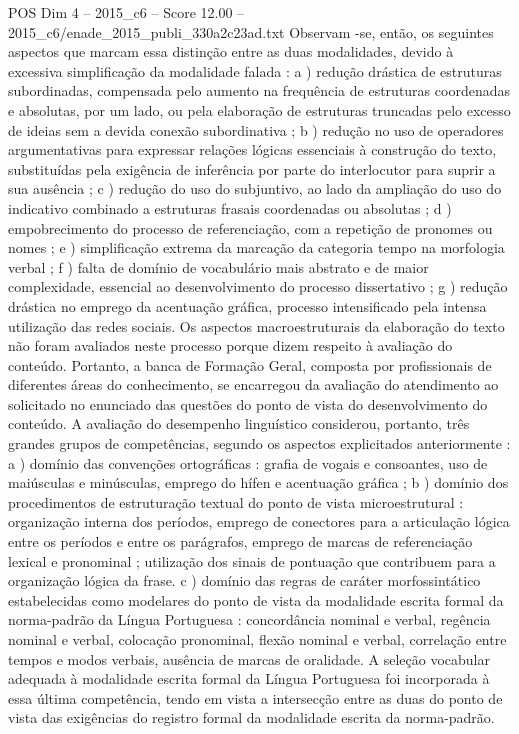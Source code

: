 \begin{textsample}{POS Dim 4 – 2015\_c6 – Score 12.00 – 2015\_c6/enade\_2015\_publi\_330a2c23ad.txt}
Observam -se, então, os seguintes aspectos que marcam essa distinção entre as duas modalidades, devido à excessiva simplificação da modalidade falada : a ) redução drástica de estruturas subordinadas, compensada pelo aumento na frequência de estruturas coordenadas e absolutas, por um lado, ou pela elaboração de estruturas truncadas pelo excesso de ideias sem a devida conexão subordinativa ; b ) redução no uso de operadores argumentativas para expressar relações lógicas essenciais à construção do texto, substituídas pela exigência de inferência por parte do interlocutor para suprir a sua ausência ; c ) redução do uso do subjuntivo, ao lado da ampliação do uso do indicativo combinado a estruturas frasais coordenadas ou absolutas ; d ) empobrecimento do processo de referenciação, com a repetição de pronomes ou nomes ; e ) simplificação extrema da marcação da categoria tempo na morfologia verbal ; f ) falta de domínio de vocabulário mais abstrato e de maior complexidade, essencial ao desenvolvimento do processo dissertativo ; g ) redução drástica no emprego da acentuação gráfica, processo intensificado pela intensa utilização das redes sociais.
Os aspectos macroestruturais da elaboração do texto não foram avaliados neste processo porque dizem respeito à avaliação do conteúdo.
Portanto, a banca de Formação Geral, composta por profissionais de diferentes áreas do conhecimento, se encarregou da avaliação do atendimento ao solicitado no enunciado das questões do ponto de vista do desenvolvimento do conteúdo.
A avaliação do desempenho linguístico considerou, portanto, três grandes grupos de competências, segundo os aspectos explicitados anteriormente : a ) domínio das convenções ortográficas : grafia de vogais e consoantes, uso de maiúsculas e minúsculas, emprego do hífen e acentuação gráfica ; b ) domínio dos procedimentos de estruturação textual do ponto de vista microestrutural : organização interna dos períodos, emprego de conectores para a articulação lógica entre os períodos e entre os parágrafos, emprego de marcas de referenciação lexical e pronominal ; utilização dos sinais de pontuação que contribuem para a organização lógica da frase. c ) domínio das regras de caráter morfossintático estabelecidas como modelares do ponto de vista da modalidade escrita formal da norma-padrão da Língua Portuguesa : concordância nominal e verbal, regência nominal e verbal, colocação pronominal, flexão nominal e verbal, correlação entre tempos e modos verbais, ausência de marcas de oralidade.
A seleção vocabular adequada à modalidade escrita formal da Língua Portuguesa foi incorporada à essa última competência, tendo em vista a intersecção entre as duas do ponto de vista das exigências do registro formal da modalidade escrita da norma-padrão.

\end{textsample}
